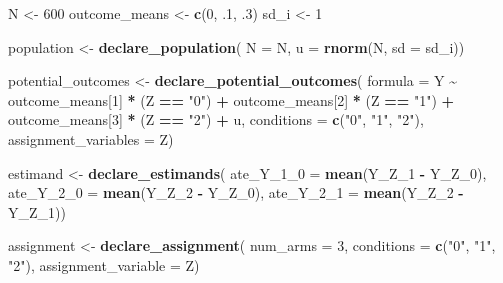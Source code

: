 \documentclass[
]{article}
\newenvironment{Shaded}{\begin{snugshade}}{\end{snugshade}}
\newcommand{\DataTypeTok}[1]{\textcolor[rgb]{0.13,0.29,0.53}{#1}}
\newcommand{\DecValTok}[1]{\textcolor[rgb]{0.00,0.00,0.81}{#1}}
\newcommand{\FloatTok}[1]{\textcolor[rgb]{0.00,0.00,0.81}{#1}}
\newcommand{\KeywordTok}[1]{\textcolor[rgb]{0.13,0.29,0.53}{\textbf{#1}}}
\newcommand{\NormalTok}[1]{#1}
\newcommand{\OperatorTok}[1]{\textcolor[rgb]{0.81,0.36,0.00}{\textbf{#1}}}
\newcommand{\StringTok}[1]{\textcolor[rgb]{0.31,0.60,0.02}{#1}}
\begin{document}
\begin{Shaded}
\begin{Highlighting}[]
\NormalTok{N \textless{}{-}}\StringTok{ }\DecValTok{600}
\NormalTok{outcome\_means \textless{}{-}}\StringTok{ }\KeywordTok{c}\NormalTok{(}\DecValTok{0}\NormalTok{, }\FloatTok{.1}\NormalTok{, }\FloatTok{.3}\NormalTok{)}
\NormalTok{sd\_i \textless{}{-}}\StringTok{ }\DecValTok{1}

\NormalTok{population \textless{}{-}}\StringTok{ }\KeywordTok{declare\_population}\NormalTok{(}
  \DataTypeTok{N =}\NormalTok{ N, }\DataTypeTok{u =} \KeywordTok{rnorm}\NormalTok{(N, }\DataTypeTok{sd =}\NormalTok{ sd\_i))}

\NormalTok{potential\_outcomes \textless{}{-}}\StringTok{ }\KeywordTok{declare\_potential\_outcomes}\NormalTok{(}
  \DataTypeTok{formula =}\NormalTok{ Y }\OperatorTok{\textasciitilde{}}\StringTok{ }\NormalTok{outcome\_means[}\DecValTok{1}\NormalTok{] }\OperatorTok{*}\StringTok{ }\NormalTok{(Z }\OperatorTok{==}\StringTok{ "0"}\NormalTok{) }\OperatorTok{+}
\StringTok{    }\NormalTok{outcome\_means[}\DecValTok{2}\NormalTok{] }\OperatorTok{*}\StringTok{ }\NormalTok{(Z }\OperatorTok{==}\StringTok{ "1"}\NormalTok{) }\OperatorTok{+}
\StringTok{    }\NormalTok{outcome\_means[}\DecValTok{3}\NormalTok{] }\OperatorTok{*}\StringTok{ }\NormalTok{(Z }\OperatorTok{==}\StringTok{ "2"}\NormalTok{) }\OperatorTok{+}\StringTok{ }\NormalTok{u,}
  \DataTypeTok{conditions =} \KeywordTok{c}\NormalTok{(}\StringTok{"0"}\NormalTok{, }\StringTok{"1"}\NormalTok{, }\StringTok{"2"}\NormalTok{),}
  \DataTypeTok{assignment\_variables =}\NormalTok{ Z)}

\NormalTok{estimand \textless{}{-}}\StringTok{ }\KeywordTok{declare\_estimands}\NormalTok{(}
  \DataTypeTok{ate\_Y\_1\_0 =} \KeywordTok{mean}\NormalTok{(Y\_Z\_}\DecValTok{1} \OperatorTok{{-}}\StringTok{ }\NormalTok{Y\_Z\_}\DecValTok{0}\NormalTok{),}
  \DataTypeTok{ate\_Y\_2\_0 =} \KeywordTok{mean}\NormalTok{(Y\_Z\_}\DecValTok{2} \OperatorTok{{-}}\StringTok{ }\NormalTok{Y\_Z\_}\DecValTok{0}\NormalTok{),}
  \DataTypeTok{ate\_Y\_2\_1 =} \KeywordTok{mean}\NormalTok{(Y\_Z\_}\DecValTok{2} \OperatorTok{{-}}\StringTok{ }\NormalTok{Y\_Z\_}\DecValTok{1}\NormalTok{))}

\NormalTok{assignment \textless{}{-}}\StringTok{ }\KeywordTok{declare\_assignment}\NormalTok{(}
  \DataTypeTok{num\_arms =} \DecValTok{3}\NormalTok{,}
  \DataTypeTok{conditions =} \KeywordTok{c}\NormalTok{(}\StringTok{"0"}\NormalTok{, }\StringTok{"1"}\NormalTok{, }\StringTok{"2"}\NormalTok{),}
  \DataTypeTok{assignment\_variable =}\NormalTok{ Z)}


\end{Highlighting}
\end{Shaded}
\end{document}
